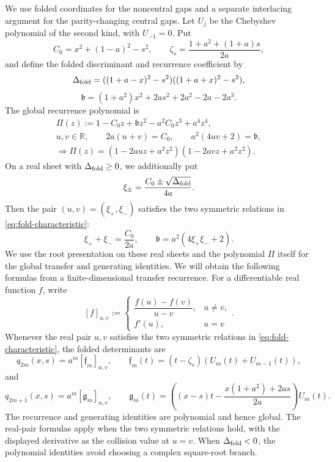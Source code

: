 \documentclass[preprints,article,accept,oneauthor]{Definitions/mdpi}
\numberwithin{equation}{section}
\theoremstyle{mdpi}
\theoremstyle{definition}
\begin{document}
We use folded coordinates for the noncentral gaps and a separate
interlacing argument for the parity-changing central gaps.
Let \(U_j\) be the Chebyshev polynomial of the second kind, with
\(U_{-1}=0\).  Put
\[
 C_0=x^2+(1-a)^2-s^2,\qquad
 \zeta_s=\frac{1+a^2+(1+a)s}{2a},
\]
and define the folded discriminant and recurrence coefficient by
\[
 \Delta_{\rm fold}=((1+a-x)^2-s^2)((1+a+x)^2-s^2),
\]
\[
 \mathfrak b=(1+a^2)x^2+2as^2+2a^2-2a-2a^3.
\]
The global recurrence polynomial is
\begin{equation}\label{eq:fold-characteristic}
\begin{gathered}
 \Pi(z):=1-C_0z+\mathfrak b z^2-a^2C_0z^3+a^4z^4,\\
 u,v\in\mathbb R,\qquad
 2a(u+v)=C_0,\qquad a^2(4uv+2)=\mathfrak b,\\
 \Longrightarrow
 \Pi(z)=(1-2auz+a^2z^2)(1-2avz+a^2z^2).
\end{gathered}
\end{equation}
On a real sheet with \(\Delta_{\rm fold}\geq0\), we additionally put
\[
 \xi_\pm=\frac{C_0\pm\sqrt{\Delta_{\rm fold}}}{4a}.
\]
Then the pair \((u,v)=(\xi_+,\xi_-)\) satisfies the two symmetric
relations in \eqref{eq:fold-characteristic}:
\[
 \xi_++\xi_-=\frac{C_0}{2a},\qquad
 \mathfrak b=a^2(4\xi_+\xi_-+2).
\]
We use the root presentation on these real sheets and the polynomial
\(\Pi\) itself for the global transfer and generating identities.
We will obtain the following formulas from a finite-dimensional transfer
recurrence.  For a differentiable real function \(f\),
write
\[
 [f]_{u,v}:=
 \begin{cases}
  \dfrac{f(u)-f(v)}{u-v},&u\neq v,\\[2mm]
  f'(u),&u=v
 \end{cases}.
\]
Whenever the real pair \(u,v\) satisfies the two symmetric relations in
\eqref{eq:fold-characteristic}, the folded determinants are
\begin{equation}\label{eq:fold-even}
 q_{2m}(x,s)=a^m[\mathfrak f_m]_{u,v},\qquad
 \mathfrak f_m(t)=(t-\zeta_s)(U_m(t)+U_{m-1}(t)),
\end{equation}
and
\begin{equation}\label{eq:fold-odd}
 q_{2m+1}(x,s)=a^m[\mathfrak g_m]_{u,v},\qquad
 \mathfrak g_m(t)=\left((x-s)t-
 \frac{x(1+a^2)+2as}{2a}\right)U_m(t).
\end{equation}
The recurrence and generating identities are polynomial and hence global.
The real-pair formulas apply when the two symmetric relations hold, with the
displayed derivative as the collision value at \(u=v\).  When
\(\Delta_{\rm fold}<0\), the polynomial identities avoid choosing a complex
square-root branch.
\end{document}
